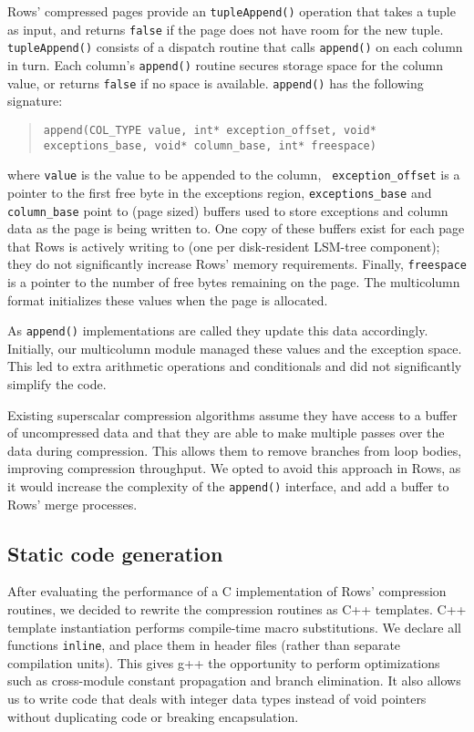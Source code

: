 \documentclass{sig-alternate-sigmod08}
\newcommand{\rows}{Rows\xspace}
\newcommand{\rowss}{Rows'\xspace}
\begin{document}
\rowss compressed pages provide an {\tt tupleAppend()} operation that
takes a tuple as input, and returns {\tt false} if the page does not have
room for the new tuple.  {\tt tupleAppend()} consists of a dispatch
routine that calls {\tt append()} on each column in turn.  Each
column's {\tt append()} routine secures storage space for the column
value, or returns {\tt false} if no space is available.  {\tt append()} has the
following signature:
\begin{quote}
  {\tt append(COL\_TYPE value, int* exception\_offset,
       void* exceptions\_base, void* column\_base, int* freespace) }
\end{quote}
where {\tt value} is the value to be appended to the column, {\tt
  exception\_offset} is a pointer to the first free byte in the
exceptions region, {\tt exceptions\_base} and {\tt column\_base} point
to (page sized) buffers used to store exceptions and column data as
the page is being written to.  One copy of these buffers exist for
each page that \rows is actively writing to (one per disk-resident
LSM-tree component); they do not significantly increase \rowss memory
requirements.  Finally, {\tt freespace} is a pointer to the number of
free bytes remaining on the page.  The multicolumn format initializes
these values when the page is allocated.

As {\tt append()} implementations are called they update this data
accordingly.  Initially, our multicolumn module
managed these values and the exception space.  This led to
extra arithmetic operations and conditionals and did not
significantly simplify the code.


Existing superscalar compression algorithms assume they have access to
a buffer of uncompressed data and that they are able to make multiple
passes over the data during compression.  This allows them to remove
branches from loop bodies, improving compression throughput.  We opted
to avoid this approach in \rows, as it would increase the complexity
of the {\tt append()} interface, and add a buffer to \rowss merge processes.

\subsection{Static code generation}

After evaluating the performance of a C implementation of \rowss
compression routines, we decided to rewrite the compression routines
as C++ templates.  C++ template instantiation performs compile-time
macro substitutions.  We declare all functions {\tt inline}, and place
them in header files (rather than separate compilation units).  This
gives g++ the opportunity to perform optimizations such as
cross-module constant propagation and branch elimination.  It also
allows us to write code that deals with integer data types instead of
void pointers without duplicating code or breaking encapsulation.
\end{document}
